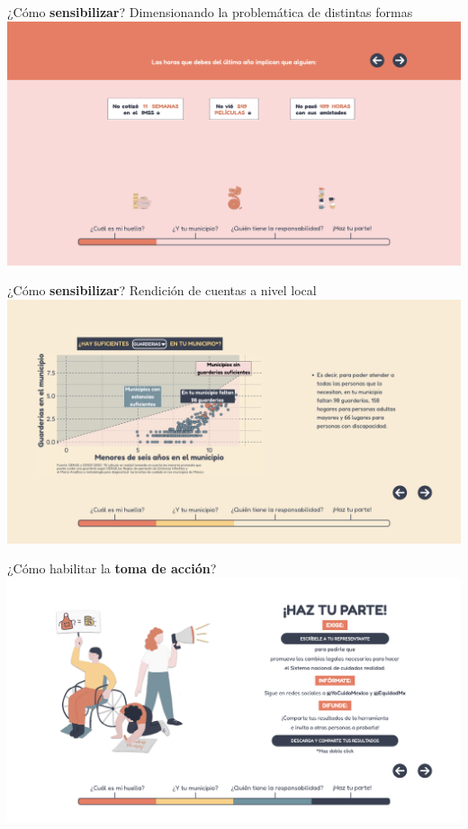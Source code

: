 \documentclass[
  ignorenonframetext,
]{beamer}
\begin{document}
\begin{frame}{¿Cómo \textbf{sensibilizar}? Dimensionando la problemática
de distintas formas}
\protect\hypertarget{cuxf3mo-sensibilizar-dimensionando-la-problemuxe1tica-de-distintas-formas}{}
\href{https://huelladecuidados.datacivica.org/\#mi-huella-3}{\includegraphics{img/preguntas/costop.png}}
\end{frame}

\begin{frame}{¿Cómo \textbf{sensibilizar}? Rendición de cuentas a nivel
local}
\protect\hypertarget{cuxf3mo-sensibilizar-rendiciuxf3n-de-cuentas-a-nivel-local}{}
\href{https://huelladecuidados.datacivica.org/\#municipal-2}{\includegraphics{img/preguntas/scat.png}}
\end{frame}

\begin{frame}{¿Cómo habilitar la \textbf{toma de acción}?}
\protect\hypertarget{cuxf3mo-habilitar-la-toma-de-acciuxf3n}{}
\href{https://huelladecuidados.datacivica.org/\#haz-parte}{\includegraphics{img/preguntas/call2act.png}}
\end{frame}
\end{document}
